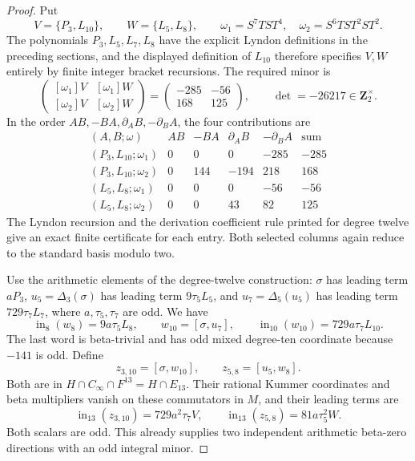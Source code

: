 \begin{proof}
Put
\[
 V=\{P_3,L_{10}\},\qquad W=\{L_5,L_8\},\qquad
 \omega_1=S^7TST^4,\quad \omega_2=S^6TST^2ST^2.
\]
The polynomials $P_3,L_5,L_7,L_8$ have the explicit Lyndon
definitions in the preceding sections, and the displayed
definition of $L_{10}$ therefore specifies $V,W$ entirely by
finite integer bracket recursions. The required minor is
\begin{equation}\label{eq:thirteen-unit-minor}
 \begin{pmatrix}[\omega_1]V&[\omega_1]W\\
                 [\omega_2]V&[\omega_2]W\end{pmatrix}
 =\begin{pmatrix}-285&-56\\168&125\end{pmatrix},
 \qquad \det=-26217\in\mathbf Z_2^\times.
\end{equation}
In the order $AB,-BA,\partial_A B,-\partial_B A$, the four
contributions are
\[
\begin{array}{c|r|r|r|r|r}
(A,B;\omega)&AB&-BA&\partial_A B&-\partial_B A&\text{sum}\\\hline
(P_3,L_{10};\omega_1)&0&0&0&-285&-285\\
(P_3,L_{10};\omega_2)&0&144&-194&218&168\\
(L_5,L_8;\omega_1)&0&0&0&-56&-56\\
(L_5,L_8;\omega_2)&0&0&43&82&125
\end{array}
\]
The Lyndon recursion and the derivation coefficient rule printed
for degree twelve give an exact finite certificate for each
entry. Both selected columns again reduce to the standard basis
modulo two.

Use the arithmetic elements of the degree-twelve construction:
$\sigma$ has leading term $aP_3$,
$u_5=\Delta_3(\sigma)$ has leading term $9\tau_5L_5$, and
$u_7=\Delta_5(u_5)$ has leading term $729\tau_7L_7$, where
$a,\tau_5,\tau_7$ are odd. We have
\[
 \operatorname{in}_8(w_8)=9a\tau_5L_8,\qquad
 w_{10}=[\sigma,u_7],\qquad
 \operatorname{in}_{10}(w_{10})=729a\tau_7L_{10}.
\]
The last word is beta-trivial and has odd mixed degree-ten
coordinate because $-141$ is odd. Define
\[
 z_{3,10}=[\sigma,w_{10}],\qquad z_{5,8}=[u_5,w_8].
\]
Both are in $H\cap C_\infty\cap F^{13}=H\cap E_{13}$.
Their rational Kummer coordinates and beta multipliers vanish
on these commutators in $M$, and their leading terms are
\begin{equation}\label{eq:thirteen-arithmetic-columns}
 \operatorname{in}_{13}(z_{3,10})=729a^2\tau_7V,\qquad
 \operatorname{in}_{13}(z_{5,8})=81a\tau_5^2W.
\end{equation}
Both scalars are odd. This already supplies two independent
arithmetic beta-zero directions with an odd integral minor.


\end{proof}

